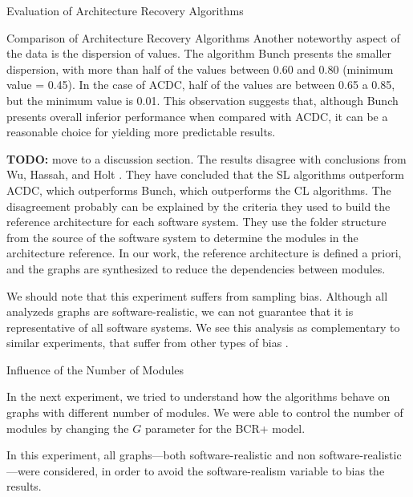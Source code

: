 \documentclass[11pt,twocolumn,a4paper,english]{article}
\newcommand{\TODO}{\textbf{TODO:} }
\begin{document}
\begin{section}{Evaluation of Architecture Recovery Algorithms}
\begin{subsection}{Comparison of Architecture Recovery Algorithms}
	Another noteworthy aspect of the data is the dispersion of values. The algorithm Bunch presents the smaller dispersion, with more than half of the values between 0.60 and 0.80 (minimum value = 0.45). In the case of ACDC, half of the values are between 0.65 a 0.85, but the minimum value is 0.01. This observation suggests that, although Bunch presents overall inferior performance when compared with ACDC, it can be a reasonable choice for yielding more predictable results.
	
	\TODO move to a discussion section.
	The results disagree with conclusions from Wu, Hassah, and Holt \cite{Wu2005}. They have concluded that the SL algorithms outperform ACDC, which outperforms Bunch, which outperforms the CL algorithms. The disagreement probably can be explained by the criteria they used to build the reference architecture for each software system. They use the folder structure from the source of the software system to determine the modules in the architecture reference. In our work, the reference architecture is defined a priori, and the graphs are synthesized to reduce the dependencies between modules.
	
	We should note that this experiment suffers from sampling bias. Although all analyzeds graphs are software-realistic, we can not guarantee that it is representative of all software systems. We see this analysis as complementary to similar experiments, that suffer from other types of bias \cite{Wu2005,Bittencourt2009,Andritsos2005}.
	
\end{subsection}	

\begin{subsection}{Influence of the Number of Modules}
	
	In the next experiment, we tried to understand how the algorithms behave on graphs with different number of modules. We were able to control the number of modules by changing the $G$ parameter for the BCR+ model.
	
	In this experiment, all graphs---both software-realistic and non software-realistic---were considered, in order to avoid the software-realism variable to bias the results.
	


\end{subsection}
\end{section}
\end{document}

